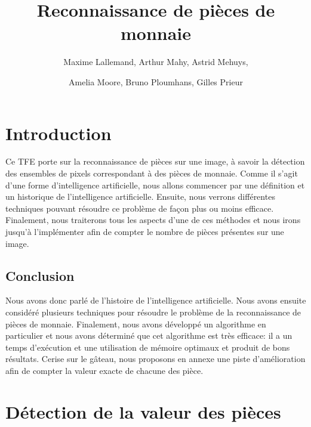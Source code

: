 \documentclass[12pt,titlepage]{article}
\begin{document}
\title{Reconnaissance de pièces de monnaie}
\author{Maxime Lallemand, Arthur Mahy, Astrid Mehuys, \and Amelia Moore, Bruno Ploumhans, Gilles Prieur}

\maketitle

\tableofcontents
\newpage

\section*{Introduction}
Ce TFE porte sur la reconnaissance de pièces sur une image, à savoir la détection des ensembles de pixels correspondant à des pièces de monnaie. Comme il s'agit d'une forme d'intelligence artificielle, nous allons commencer par une définition et un historique de l'intelligence artificielle. Ensuite, nous verrons différentes techniques pouvant résoudre ce problème de façon plus ou moins efficace. Finalement, nous traiterons tous les aspects d'une de ces méthodes et nous irons jusqu'à l'implémenter afin de compter le nombre de pièces présentes sur une image.







\subsection*{Conclusion}
Nous avons donc parlé de l'histoire de l'intelligence artificielle. Nous avons ensuite considéré plusieurs techniques pour résoudre le problème de la reconnaissance de pièces de monnaie. Finalement, nous avons développé un algorithme en particulier et nous avons déterminé que cet algorithme est très efficace: il a un temps d'exécution et une utilisation de mémoire optimaux et produit de bons résultats. Cerise sur le gâteau, nous proposons en annexe une piste d'amélioration afin de compter la valeur exacte de chacune des pièce.

\appendix

\section{Détection de la valeur des pièces}
\end{document}

